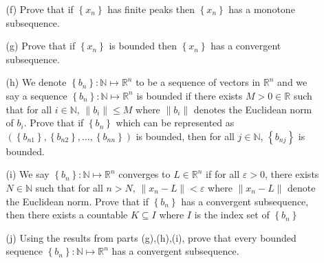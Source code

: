 \documentclass[letterpaper,12pt]{article}
\newcommand{\set}[1]{\left\{ #1 \right\}}
\theoremstyle{definition}
\begin{document}
\pagebreak
\begin{enumerate}
    \item[] \begin{enumerate}
        \item[(f)] Prove that if $\set{x_n}$ has finite peaks then $\set{x_n}$ has a monotone subsequence. 
    \end{enumerate}
\end{enumerate}
\pagebreak
\begin{enumerate}
    \item[] \begin{enumerate}
        \item[(g)] Prove that if $\set{x_n}$ is bounded then $\set{x_n}$ has a convergent subsequence.
    \end{enumerate}
\end{enumerate}
\pagebreak
\begin{enumerate}
    \item[] \begin{enumerate}
        \item[(h)] We denote $\set{b_n} : \mathbb{N} \mapsto \mathbb{R}^n$ to be a sequence of vectors in $ \mathbb{R}^n$ and we say a sequence $\set{b_n} : \mathbb{N} \mapsto \mathbb{R}^n$ is bounded if there exists $M >0 \in \mathbb{R}$ such that for all $i \in \mathbb{N}$, $\|b_i \| \leq M$ where $\| b_i \|$ denotes the Euclidean norm of $b_i$. Prove that if $\set{b_n}$ which can be represented as $(\set{b_{n1}},\set{b_{n2}},\ldots,\set{b_{nn}})$ is bounded, then for all $j \in \mathbb{N}$, $\set{b_{nj}}$ is bounded.
    \end{enumerate}
\end{enumerate}
\pagebreak
\begin{enumerate}
    \item[] \begin{enumerate}
        \item[(i)] We say $\set{b_n} : \mathbb{N} \mapsto \mathbb{R}^n$ converges to $L \in \mathbb{R}^n$ if for all $\varepsilon > 0$, there exists $N \in \mathbb{N}$ such that for all $n > N$, $\|x_n - L \| < \varepsilon$ where $\|x_n-L\|$ denote the Euclidean norm. Prove that if $\set{b_n}$ has a convergent subsequence, then there exists a countable $K \subseteq I$ where $I$ is the index set of $\set{b_n}$
    \end{enumerate}
\end{enumerate}
\pagebreak
\begin{enumerate}
    \item[] \begin{enumerate}
        \item[(j)] Using the results from parts (g),(h),(i), prove that every bounded sequence $\set{b_n}: \mathbb{N} \mapsto \mathbb{R}^n$ has a convergent subsequence.
    \end{enumerate}
\end{enumerate}
\end{document}
